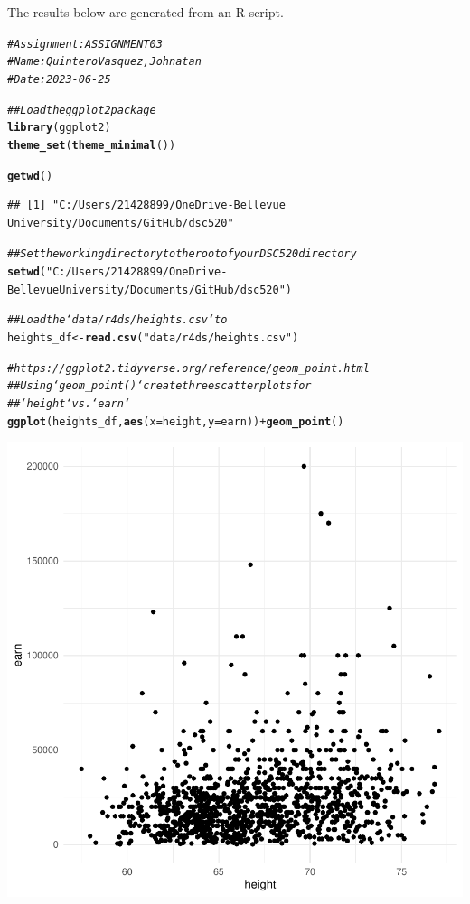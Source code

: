 \documentclass{article}\usepackage[]{graphicx}\usepackage[]{xcolor}
\makeatletter
\newcommand{\hlstr}[1]{\textcolor[rgb]{0.192,0.494,0.8}{#1}}%
\newcommand{\hlcom}[1]{\textcolor[rgb]{0.678,0.584,0.686}{\textit{#1}}}%
\newcommand{\hlopt}[1]{\textcolor[rgb]{0,0,0}{#1}}%
\newcommand{\hlstd}[1]{\textcolor[rgb]{0.345,0.345,0.345}{#1}}%
\newcommand{\hlkwb}[1]{\textcolor[rgb]{0.69,0.353,0.396}{#1}}%
\newcommand{\hlkwc}[1]{\textcolor[rgb]{0.333,0.667,0.333}{#1}}%
\newcommand{\hlkwd}[1]{\textcolor[rgb]{0.737,0.353,0.396}{\textbf{#1}}}%
\newenvironment{kframe}{%
 \def\at@end@of@kframe{}%
 \ifinner\ifhmode%
  \def\at@end@of@kframe{\end{minipage}}%
  \begin{minipage}{\columnwidth}%
 \fi\fi%
 \def\FrameCommand##1{\hskip\@totalleftmargin \hskip-\fboxsep
 \colorbox{shadecolor}{##1}\hskip-\fboxsep
     \hskip-\linewidth \hskip-\@totalleftmargin \hskip\columnwidth}%
 \MakeFramed {\advance\hsize-\width
   \@totalleftmargin\z@ \linewidth\hsize
   \@setminipage}}%
 {\par\unskip\endMakeFramed%
 \at@end@of@kframe}
\newenvironment{knitrout}{}{} %
\makeatother
\begin{document}
The results below are generated from an R script.

\begin{knitrout}
\color{fgcolor}\begin{kframe}
\begin{alltt}
\hlcom{# Assignment: ASSIGNMENT 03}
\hlcom{# Name: Quintero Vasquez, Johnatan}
\hlcom{# Date: 2023-06-25}

\hlcom{## Load the ggplot2 package}
\hlkwd{library}\hlstd{(ggplot2)}
\hlkwd{theme_set}\hlstd{(}\hlkwd{theme_minimal}\hlstd{())}

\hlkwd{getwd}\hlstd{()}
\end{alltt}
\begin{verbatim}
## [1] "C:/Users/21428899/OneDrive-Bellevue University/Documents/GitHub/dsc520"
\end{verbatim}
\begin{alltt}
\hlcom{## Set the working directory to the root of your DSC 520 directory}
\hlkwd{setwd}\hlstd{(}\hlstr{"C:/Users/21428899/OneDrive-Bellevue University/Documents/GitHub/dsc520"}\hlstd{)}

\hlcom{## Load the `data/r4ds/heights.csv` to}
\hlstd{heights_df} \hlkwb{<-} \hlkwd{read.csv}\hlstd{(}\hlstr{"data/r4ds/heights.csv"}\hlstd{)}

\hlcom{# https://ggplot2.tidyverse.org/reference/geom_point.html}
\hlcom{## Using `geom_point()` create three scatterplots for}
\hlcom{## `height` vs. `earn`}
\hlkwd{ggplot}\hlstd{(heights_df,} \hlkwd{aes}\hlstd{(}\hlkwc{x} \hlstd{= height,} \hlkwc{y} \hlstd{= earn))} \hlopt{+} \hlkwd{geom_point}\hlstd{()}
\end{alltt}
\end{kframe}

{\centering \includegraphics[width=.6\linewidth]{figure/assignment-03-Quintero-Vasquez-Johnatan-Rnwauto-report-1} 

}
\end{knitrout}
\end{document}
